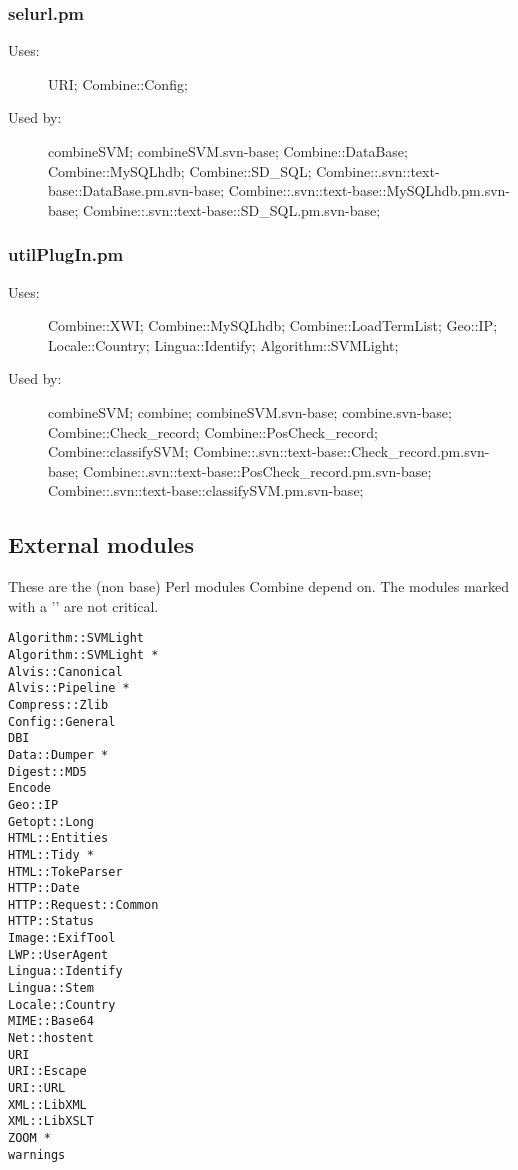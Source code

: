 \subsubsection{selurl.pm}
\begin{description}
\item[Uses:] URI; Combine::Config; 

\item[Used by:] combineSVM; combineSVM.svn-base; Combine::DataBase; Combine::MySQLhdb; Combine::SD\_SQL; Combine::.svn::text-base::DataBase.pm.svn-base; Combine::.svn::text-base::MySQLhdb.pm.svn-base; Combine::.svn::text-base::SD\_SQL.pm.svn-base; 

\end{description}
\subsubsection{utilPlugIn.pm}
\begin{description}
\item[Uses:] Combine::XWI; Combine::MySQLhdb; Combine::LoadTermList; Geo::IP; Locale::Country; Lingua::Identify; Algorithm::SVMLight; 

\item[Used by:] combineSVM; combine; combineSVM.svn-base; combine.svn-base; Combine::Check\_record; Combine::PosCheck\_record; Combine::classifySVM; Combine::.svn::text-base::Check\_record.pm.svn-base; Combine::.svn::text-base::PosCheck\_record.pm.svn-base; Combine::.svn::text-base::classifySVM.pm.svn-base; 

\end{description}
\subsection{External modules}
\label{extmods}
These are the (non base) Perl modules Combine depend on.
The modules marked with a '{\tt *}' are not critical.
\begin{verbatim}
Algorithm::SVMLight
Algorithm::SVMLight *
Alvis::Canonical
Alvis::Pipeline *
Compress::Zlib
Config::General
DBI
Data::Dumper *
Digest::MD5
Encode
Geo::IP
Getopt::Long
HTML::Entities
HTML::Tidy *
HTML::TokeParser
HTTP::Date
HTTP::Request::Common
HTTP::Status
Image::ExifTool
LWP::UserAgent
Lingua::Identify
Lingua::Stem
Locale::Country
MIME::Base64
Net::hostent
URI
URI::Escape
URI::URL
XML::LibXML
XML::LibXSLT
ZOOM *
warnings
\end{verbatim}
